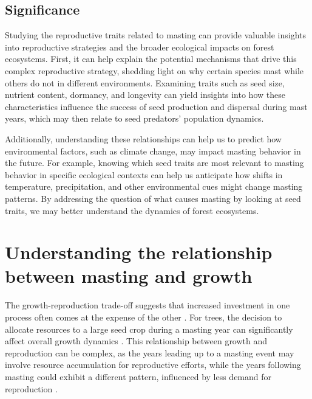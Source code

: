 \documentclass[11pt,letter]{article}
\begin{document}
\subsection{Significance} 
Studying the reproductive traits related to masting can provide valuable insights into reproductive strategies and the broader ecological impacts on forest ecosystems. First, it can help explain the potential mechanisms that drive this complex reproductive strategy, shedding light on why certain species mast while others do not in different environments. Examining traits such as seed size, nutrient content, dormancy, and longevity can yield insights into how these characteristics influence the success of seed production and dispersal during mast years, which may then relate to seed predators' population dynamics.\par

Additionally, understanding these relationships can help us to predict how environmental factors, such as climate change, may impact masting behavior in the future. For example, knowing which seed traits are most relevant to masting behavior in specific ecological contexts can help us anticipate how shifts in temperature, precipitation, and other environmental cues might change masting patterns. By addressing the question of what causes masting by looking at seed traits, we may better understand the dynamics of forest ecosystems.\par

\section{Understanding the relationship between masting and growth}
The growth-reproduction trade-off suggests that increased investment in one process often comes at the expense of the other \citep{grime1977evidence, stearns1998evolution}. For trees, the decision to allocate resources to a large seed crop during a masting year can significantly affect overall growth dynamics \citep{hacket2016tree}. This relationship between growth and reproduction can be complex, as the years leading up to a masting event may involve resource accumulation for reproductive efforts, while the years following masting could exhibit a different pattern, influenced by less demand for reproduction \citep{kelly1994evolutionary}.\par
\end{document}
